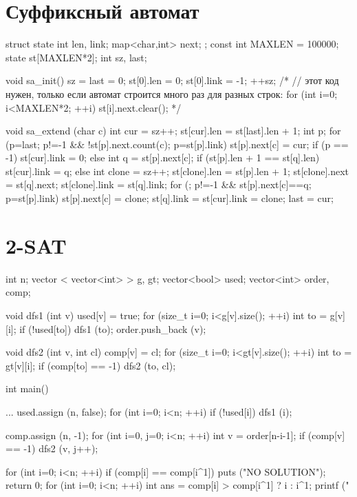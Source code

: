 \documentclass[12pt, titlepage]{article}
\begin{document}
\section{Суффиксный автомат}
\begin{cppcode}
struct state {
	int len, link;
	map<char,int> next;
};
const int MAXLEN = 100000;
state st[MAXLEN*2];
int sz, last;

void sa_init() {
	sz = last = 0;
	st[0].len = 0;
	st[0].link = -1;
	++sz;
	/*
	// этот код нужен, только если автомат строится много раз для разных строк:
	for (int i=0; i<MAXLEN*2; ++i)
		st[i].next.clear();
	*/
}

void sa_extend (char c) {
	int cur = sz++;
	st[cur].len = st[last].len + 1;
	int p;
	for (p=last; p!=-1 && !st[p].next.count(c); p=st[p].link)
		st[p].next[c] = cur;
	if (p == -1)
		st[cur].link = 0;
	else {
		int q = st[p].next[c];
		if (st[p].len + 1 == st[q].len)
			st[cur].link = q;
		else {
			int clone = sz++;
			st[clone].len = st[p].len + 1;
			st[clone].next = st[q].next;
			st[clone].link = st[q].link;
			for (; p!=-1 && st[p].next[c]==q; p=st[p].link)
				st[p].next[c] = clone;
			st[q].link = st[cur].link = clone;
		}
	}
	last = cur;
}
\end{cppcode}

\section{2-SAT}
\begin{cppcode}
int n;
vector < vector<int> > g, gt;
vector<bool> used;
vector<int> order, comp;

void dfs1 (int v) {
               used[v] = true;
	for (size_t i=0; i<g[v].size(); ++i) {
		int to = g[v][i];
		if (!used[to])
			dfs1 (to);
	}
	order.push_back (v);
}

void dfs2 (int v, int cl) {
	comp[v] = cl;
	for (size_t i=0; i<gt[v].size(); ++i) {
		int to = gt[v][i];
		if (comp[to] == -1)
			dfs2 (to, cl);
	}
}

int main() {
               ...
	used.assign (n, false);
	for (int i=0; i<n; ++i)
		if (!used[i])
			dfs1 (i);

	comp.assign (n, -1);
	for (int i=0, j=0; i<n; ++i) {
		int v = order[n-i-1];
		if (comp[v] == -1)
			dfs2 (v, j++);
	}

	for (int i=0; i<n; ++i)
		if (comp[i] == comp[i^1]) {
			puts ("NO SOLUTION");
			return 0;
		}
	for (int i=0; i<n; ++i) {
		int ans = comp[i] > comp[i^1] ? i : i^1;
		printf ("%
	}

}
\end{cppcode}
\end{document}

